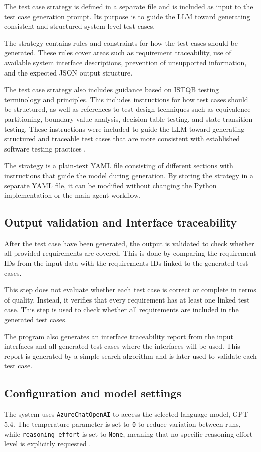 \documentclass[a4paper,12pt]{article}
\begin{document}
The test case strategy is defined in a separate file and is included as input to the test case generation prompt. Its purpose is to guide the LLM toward generating consistent and structured system-level test cases.

The strategy contains rules and constraints for how the test cases should be generated. These rules cover areas such as requirement traceability, use of available system interface descriptions, prevention of unsupported information, and the expected JSON output structure.

The test case strategy also includes guidance based on ISTQB testing terminology and principles. This includes instructions for how test cases should be structured, as well as references to test design techniques such as equivalence partitioning, boundary value analysis, decision table testing, and state transition testing. These instructions were included to guide the LLM toward generating structured and traceable test cases that are more consistent with established software testing practices \cite{istqbSystemTesting}.

The strategy is a plain-text YAML file consisting of different sections with instructions that guide the model during generation. By storing the strategy in a separate YAML file, it can be modified without changing the Python implementation or the main agent workflow.


\subsection{Output validation and Interface traceability}
After the test case have been generated, the output is validated to check whether all provided requirements are covered. This is done by comparing the requirement IDs from the input data with the requirements IDs linked to the generated test cases. 

This step does not evaluate whether each test case is correct or complete in terms of quality. Instead, it verifies that every requirement has at least one linked test case. This step is used to check whether all requirements are included in the generated test cases.

The program also generates an interface traceability report from the input interfaces and all generated test cases where the interfaces will be used. This report is generated by a simple search algorithm and is later used to validate each test case.



\subsection{Configuration and model settings}
The system uses \texttt{AzureChatOpenAI} to access the selected language model, GPT-5.4. The temperature parameter is set to \texttt{0} to reduce variation between runs, while \texttt{reasoning\_effort} is set to \texttt{None}, meaning that no specific reasoning effort level is explicitly requested \cite{langchain_azurechatopenai_docs}.
\end{document}
